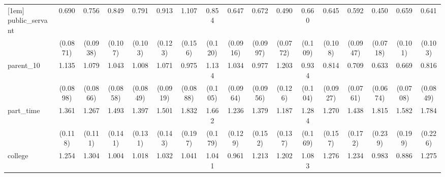{\begin{tabular}{l*{16}{c}}
[1em]
public\_servant      &       0.690\sym{**} &       0.756\sym{*}  &       0.849         &       0.791         &       0.913         &       1.107         &       0.854         &       0.647\sym{**} &       0.672\sym{**} &       0.490\sym{***}&       0.660\sym{*}  &       0.645\sym{**} &       0.592\sym{**} &       0.450\sym{***}&       0.659\sym{**} &       0.641\sym{**} \\
                    &    (0.0871)         &    (0.0938)         &     (0.107)         &     (0.103)         &     (0.123)         &     (0.156)         &     (0.120)         &    (0.0916)         &    (0.0997)         &    (0.0772)         &     (0.109)         &     (0.108)         &    (0.0947)         &    (0.0718)         &     (0.101)         &     (0.103)         \\
[1em]
parent\_10           &       1.135         &       1.079         &       1.043         &       1.008         &       1.071         &       0.975         &       1.134         &       1.034         &       0.977         &       1.203         &       0.934         &       0.814         &       0.709\sym{**} &       0.633\sym{***}&       0.669\sym{***}&       0.816         \\
                    &    (0.0898)         &    (0.0866)         &    (0.0858)         &    (0.0849)         &    (0.0919)         &    (0.0888)         &     (0.105)         &    (0.0964)         &    (0.0956)         &     (0.126)         &     (0.104)         &    (0.0927)         &    (0.0761)         &    (0.0674)         &    (0.0708)         &    (0.0849)         \\
[1em]
part\_time           &       1.361\sym{***}&       1.267\sym{**} &       1.493\sym{***}&       1.397\sym{***}&       1.501\sym{***}&       1.832\sym{***}&       1.662\sym{***}&       1.236\sym{*}  &       1.379\sym{**} &       1.187         &       1.284         &       1.270         &       1.438\sym{**} &       1.815\sym{***}&       1.582\sym{***}&       1.784\sym{***}\\
                    &     (0.118)         &     (0.111)         &     (0.141)         &     (0.131)         &     (0.143)         &     (0.197)         &     (0.179)         &     (0.129)         &     (0.152)         &     (0.137)         &     (0.169)         &     (0.157)         &     (0.172)         &     (0.239)         &     (0.199)         &     (0.226)         \\
[1em]
college             &       1.254\sym{*}  &       1.304\sym{**} &       1.004         &       1.018         &       1.032         &       1.041         &       1.041         &       0.961         &       1.213         &       1.202         &       1.083         &       1.276         &       1.234         &       0.983         &       0.886         &       1.275         \\

\end{tabular}}
